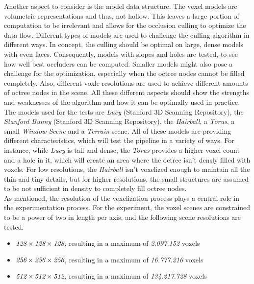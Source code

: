 \noindent
Another aspect to consider is the model data structure. The voxel models are volumetric representations and thus, 
not hollow. This leaves a large portion of computation to be irrelevant and allows for the occlusion culling to 
optimize the data flow. Different types of models are used to challenge the culling algorithm in different ways. 
In concept, the culling should be optimal on large, dense models with even faces. Consequently, models with 
slopes and holes are tested, to see how well best occluders can be computed. Smaller models might also pose a 
challenge for the optimization, especially when the octree nodes cannot be filled completely. Also, different 
voxle resolutions are used to achieve different amounts of octree nodes in the scene. All these different 
aspects should show the strengths and weaknesses of the algorithm and how it can be optimally used in practice.\\

\noindent
The models used for the tests are \emph{Lucy} (Stanford 3D Scanning Repository), the \emph{Stanford Bunny} 
(Stanford 3D Scanning Repository), the \emph{Hairball}, a \emph{Torus}, a small \emph{Window Scene} and a 
\emph{Terrain} scene. All of these models are providing different characteristics, which will test the 
pipeline in a variety of ways. For instance, while \emph{Lucy} is tall and dense, the \emph{Torus} provides 
a higher voxel count and a hole in it, which will create an area where the octree isn't densly filled with 
voxels. For low resolutions, the \emph{Hairball} isn't voxelized enough to maintain all the thin and tiny 
details, but for higher resolutions, the small structures are assumed to be not sufficient in density to 
completely fill octree nodes. \\

\noindent
As mentioned, the resolution of the voxelization process plays a central role in the experimentation process.
For the experiment, the voxel scenes are constrained to be a power of two in length per axis, and the following
scene resolutions are tested.

\begin{itemize}
    \item \begin{math} \emph{128} \times \emph{128} \times \emph{128}\end{math}, resulting in a maximum of \emph{2.097.152} voxels
    \item \begin{math} \emph{256} \times \emph{256} \times \emph{256}\end{math}, resulting in a maximum of \emph{16.777.216} voxels
    \item \begin{math} \emph{512} \times \emph{512} \times \emph{512}\end{math}, resulting in a maximum of \emph{134.217.728} voxels
\end{itemize}

